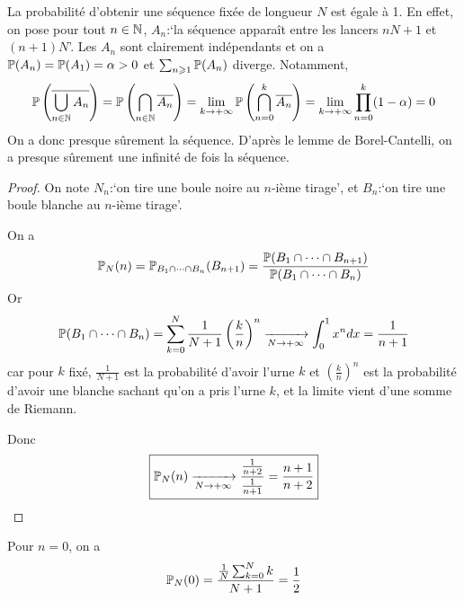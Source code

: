 \documentclass[12pt]{article}
\begin{document}
\begin{remark}
    La probabilité d'obtenir une séquence fixée de longueur $N$ est égale à 1. En effet, on pose pour tout $n\in\N$, $A_{n}$:`la séquence apparaît entre les lancers $nN+1$ et $(n+1)N$'. Les $A_{n}$ sont clairement indépendants et on a $\P(A_{n})=\P(A_{1})=\alpha>0$ et $\sum_{n\geqslant1}\P(A_{n})$ diverge. Notamment,
    \begin{equation}
        \P\left(\overline{\bigcup_{n\in\N}A_{n}}\right)=\P\left(\bigcap_{n\in\N}\overline{A_{n}}\right)=\lim\limits_{k\to+\infty}\P\left(\bigcap_{n=0}^{k}\overline{A_{n}}\right)=\lim\limits_{k\to+\infty}\prod_{n=0}^{k}(1-\alpha)=0
    \end{equation}
    On a donc presque sûrement la séquence. D'après le lemme de Borel-Cantelli, on a presque sûrement une infinité de fois la séquence.
\end{remark}

\begin{proof}
    On note $N_{n}$:`on tire une boule noire au $n$-ième tirage', et $B_{n}$:`on tire une boule blanche au $n$-ième tirage'.
    
    On a 
        \begin{equation}
            \P_{N}(n)=\P_{B_{1}\cap\dots\cap B_{n}}(B_{n+1})=\frac{\P(B_{1}\cap\dots\cap B_{n+1})}{\P(B_{1}\cap\dots\cap B_{n})}
        \end{equation}
        Or 
        \begin{equation}
            \P(B_{1}\cap\dots\cap B_{n})=\sum_{k=0}^{N}\frac{1}{N+1}\left(\frac{k}{n}\right)^{n}\xrightarrow[N\to+\infty]{}\int_{0}^{1}x^{n}dx=\frac{1}{n+1}
        \end{equation}
        car pour $k$ fixé, $\frac{1}{N+1}$ est la probabilité d'avoir l'urne $k$ et $\left(\frac{k}{n}\right)^{n}$ est la probabilité d'avoir une blanche sachant qu'on a pris l'urne $k$, et la limite vient d'une somme de Riemann.
        
        Donc 
        \begin{equation}
            \boxed{\P_{N}(n)\xrightarrow[N\to+\infty]{}\frac{\frac{1}{n+2}}{\frac{1}{n+1}}=\frac{n+1}{n+2}}
        \end{equation}
\end{proof}

\begin{remark}
    Pour $n=0$, on a 
    \begin{equation}
        \P_{N}(0)=\frac{\frac{1}{N}\sum_{k=0}^{N}k}{N+1}=\frac{1}{2}
    \end{equation}
\end{remark}
\end{document}

